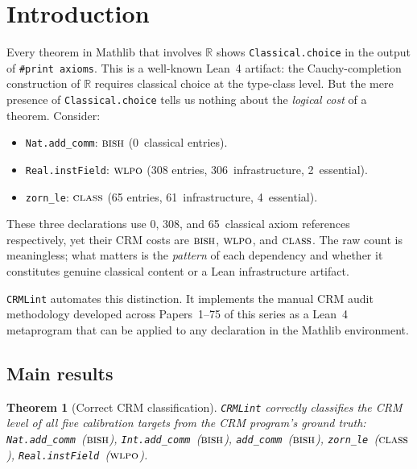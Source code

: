 \documentclass[12pt, a4paper]{article}
\theoremstyle{plain}
\newtheorem{theorem}{Theorem}[section]
\theoremstyle{definition}
\theoremstyle{remark}
\newcommand{\BISH}{\textsc{bish}}
\newcommand{\WLPO}{\textsc{wlpo}}
\newcommand{\CLASS}{\textsc{class}}
\newcommand{\CRMLint}{\texttt{CRMLint}}
\begin{document}
\section{Introduction}\label{sec:intro}

Every theorem in Mathlib that involves $\mathbb{R}$ shows
\texttt{Classical.choice} in the output of \texttt{\#print axioms}.
This is a well-known Lean~4 artifact: the Cauchy-completion
construction of $\mathbb{R}$ requires classical choice at the
type-class level.  But the mere presence of \texttt{Classical.choice}
tells us nothing about the \emph{logical cost} of a theorem.
Consider:
\begin{itemize}[nosep]
\item \texttt{Nat.add\_comm}: $\BISH$ (0~classical entries).
\item \texttt{Real.instField}: $\WLPO$ (308 entries, 306~infrastructure, 2~essential).
\item \texttt{zorn\_le}: $\CLASS$ (65 entries, 61~infrastructure, 4~essential).
\end{itemize}
These three declarations use 0, 308, and 65~classical axiom
references respectively, yet their CRM costs are $\BISH$, $\WLPO$,
and $\CLASS$.  The raw count is meaningless; what matters is the
\emph{pattern} of each dependency and whether it constitutes genuine
classical content or a Lean infrastructure artifact.

\CRMLint{} automates this distinction.  It implements the manual CRM
audit methodology developed across Papers~1--75 of this series as a
Lean~4 metaprogram that can be applied to any declaration in the
Mathlib environment.

\subsection{Main results}

\begin{theorem}[Correct CRM classification]\label{thm:A}
  \CRMLint{} correctly classifies the CRM level of all five
  calibration targets from the CRM program's ground truth:
  \texttt{Nat.add\_comm}~($\BISH$),
  \texttt{Int.add\_comm}~($\BISH$),
  \texttt{add\_comm}~($\BISH$),
  \texttt{zorn\_le}~($\CLASS$),
  \texttt{Real.instField}~($\WLPO$).
\end{theorem}
\end{document}
